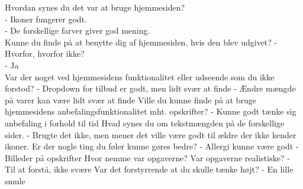 Hvordan synes du det var at bruge hjemmesiden?\\
 - Ikoner fungerer godt. \\
 - De forskellige farver giver god mening.\\
Kunne du finde på at benytte dig af hjemmesiden, hvis den blev udgivet? - Hvorfor, hvorfor ikke?\\
 - Ja\\
Var der noget ved hjemmesidens funktionalitet eller udseende som du ikke forstod?
 - Dropdown for tilbud er godt, men lidt svær at finde
 - Ændre mængde på varer kan være lidt svær at finde
Ville du kunne finde på at bruge hjemmesidens anbefalingsfunktionalitet mht. opskrifter?
 - Kunne godt tænke sig anbefaling i forhold til tid
Hvad synes du om tekstmængden på de forskellige sider.
 - Brugte det ikke, men mener det ville være godt til ældre der ikke kender ikoner.
Er der nogle ting du føler kunne gøres bedre?
 - Allergi kunne være godt
 - Billeder på opskrifter
Hvor nemme var opgaverne? Var opgaverne realistiske?
 - Til at forstå, ikke svære
Var det forstyrrende at du skulle tænke højt?
 - En lille smule


